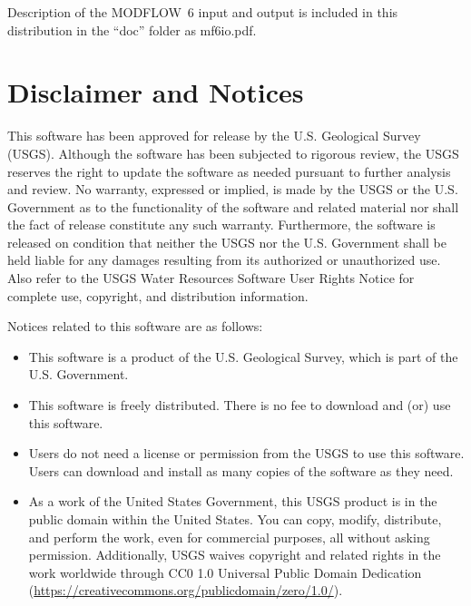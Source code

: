 \documentclass[11pt,twoside,twocolumn]{usgsreport}
\begin{document}
\noindent Description of the MODFLOW~6 input and output is included in this distribution in the ``doc'' folder as mf6io.pdf.



\section{Disclaimer and Notices}

This software has been approved for release by the U.S. Geological Survey (USGS). Although the software has been subjected to rigorous review, the USGS reserves the right to update the software as needed pursuant to further analysis and review. No warranty, expressed or implied, is made by the USGS or the U.S. Government as to the functionality of the software and related material nor shall the fact of release constitute any such warranty. Furthermore, the software is released on condition that neither the USGS nor the U.S. Government shall be held liable for any damages resulting from its authorized or unauthorized use. Also refer to the USGS Water Resources Software User Rights Notice for complete use, copyright, and distribution information.

Notices related to this software are as follows:
\begin{itemize}
\item This software is a product of the U.S. Geological Survey, which is part of the U.S. Government.

\item This software is freely distributed. There is no fee to download and (or) use this software.

\item Users do not need a license or permission from the USGS to use this software. Users can download and install as many copies of the software as they need.

\item As a work of the United States Government, this USGS product is in the public domain within the United States. You can copy, modify, distribute, and perform the work, even for commercial purposes, all without asking permission. Additionally, USGS waives copyright and related rights in the work worldwide through CC0 1.0 Universal Public Domain Dedication (\url{https://creativecommons.org/publicdomain/zero/1.0/}).
\end{itemize}
\end{document}
